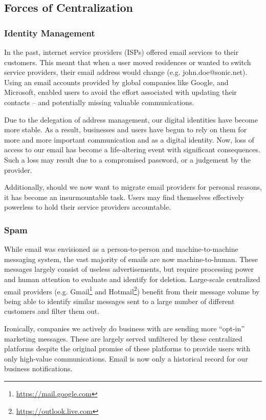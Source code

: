 \documentclass{article}
\begin{document}
\subsection{Forces of Centralization}

\subsubsection{Identity Management}

In the past, internet service providers (ISPs) offered email services to their customers. This meant that when a user moved residences or wanted to switch service providers, their email address would change (e.g. john.doe@sonic.net). Using an email accounts provided by global companies like Google, and Microsoft, enabled users to avoid the effort associated with updating their contacts -- and potentially missing valuable communications.

Due to the delegation of address management, our digital identities have become more stable. As a result, businesses and users have begun to rely on them for more and more important communication and as a digital identity. Now, loss of access to our email has become a life-altering event with significant consequences. Such a loss may result due to a compromised password, or a judgement by the provider. 

Additionally, should we now want to migrate email providers for personal reasons, it has become an insurmountable task. Users may find themselves effectively powerless to hold their service providers accountable.

\subsubsection{Spam}

While email was envisioned as a person-to-person and machine-to-machine messaging system, the vast majority of emails are now machine-to-human. These messages largely consist of useless advertisements, but require processing power and human attention to evaluate and identify for deletion. Large-scale centralized email providers (e.g. Gmail\footnote{\url{https://mail.google.com}} and Hotmail\footnote{\url{https://outlook.live.com}}) benefit from their message volume by being able to identify similar messages sent to a large number of different customers and filter them out.

Ironically, companies we actively do business with are sending more ``opt-in'' marketing messages. These are largely served unfiltered by these centralized platforms despite the original promise of these platforms to provide users with only high-value communications. Email is now only a historical record for our business notifications.
\end{document}
